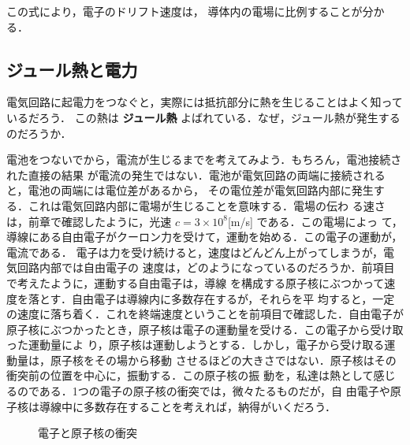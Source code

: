             この式により，電子のドリフト速度は，
            導体内の電場に比例することが分かる．

        \subsection{ジュール熱と電力}
            電気回路に起電力をつなぐと，実際には抵抗部分に熱を生じることはよく知っているだろう．
            この熱は \textbf{ジュール熱} よばれている．なぜ，ジュール熱が発生するのだろうか．

            電池をつないでから，電流が生じるまでを考えてみよう．もちろん，電池接続された直接の結果
            が電流の発生ではない．電池が電気回路の両端に接続されると，電池の両端には電位差があるから，
            その電位差が電気回路内部に発生する．これは電気回路内部に電場が生じることを意味する．電場の伝わ
            る速さは，前章で確認したように，光速 $c = 3\times 10^{8}$[m/s] である．この電場によっ
            て，導線にある自由電子がクーロン力を受けて，運動を始める．この電子の運動が，電流である．
            電子は力を受け続けると，速度はどんどん上がってしまうが，電気回路内部では自由電子の
            速度は，どのようになっているのだろうか．前項目で考えたように，運動する自由電子は，導線
            を構成する原子核にぶつかって速度を落とす．自由電子は導線内に多数存在するが，それらを平
            均すると，一定の速度に落ち着く．これを終端速度ということを前項目で確認した．自由電子が
            原子核にぶつかったとき，原子核は電子の運動量を受ける．この電子から受け取った運動量によ
            り，原子核は運動しようとする．しかし，電子から受け取る運動量は，原子核をその場から移動
            させるほどの大きさではない．原子核はその衝突前の位置を中心に，振動する．この原子核の振
            動を，私達は熱として感じるのである．1つの電子の原子核の衝突では，微々たるものだが，自
            由電子や原子核は導線中に多数存在することを考えれば，納得がいくだろう．
                        \begin{figure}[hbt]
                            \begin{center}
                                \label{fig:denryoku}
                                \caption{電子と原子核の衝突}
                            \end{center}
                        \end{figure}

